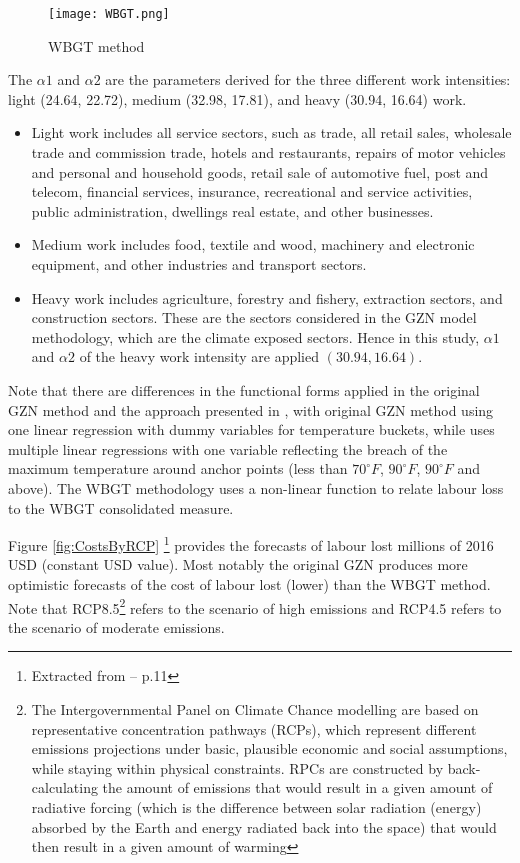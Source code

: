 \documentclass{article}
\begin{document}
\begin{figure}[H]
    \centering
    \texttt{[image: WBGT.png]}
    \caption{WBGT method}
    \label{fig:WBGT}
\end{figure}

The $\alpha1$ and $\alpha2$ are the parameters derived for the three different work intensities: light (24.64, 22.72), medium (32.98, 17.81), and heavy (30.94, 16.64) work.
\begin{itemize}
    \item Light work includes all service sectors, such as trade, all retail sales, wholesale trade and commission trade, hotels and restaurants, repairs of motor vehicles and personal and household goods, retail sale of automotive fuel, post and telecom, financial services, insurance, recreational and service activities, public administration, dwellings real estate, and other businesses.
    \item Medium work includes food, textile and wood, machinery and electronic equipment, and other industries and transport sectors.
    \item Heavy work includes agriculture, forestry and fishery, extraction sectors, and construction sectors. These are the sectors considered in the GZN model methodology, which are the climate exposed sectors. Hence in this study, $\alpha1$ and $\alpha2$ of the heavy work intensity are applied $(30.94, 16.64)$.
\end{itemize}



Note that there are differences in the functional forms applied in the original GZN method \cite{TemperatureAndTheAllocationofTime:2014} and the approach presented in \cite{TemperatureAndWork:2021}, with original GZN method using one linear regression with dummy variables for temperature buckets, while \cite{TemperatureAndWork:2021} uses multiple linear regressions with one variable reflecting the breach of the maximum temperature around anchor points (less than $70^\circ F$, $90^\circ F$, $90^\circ F$ and above). The WBGT methodology uses a non-linear function to relate labour loss to the WBGT consolidated measure.   

Figure \ref{fig:CostsByRCP} \footnote{Extracted from \cite{ZhangAndShindell:2021} -- p.11} provides the forecasts of labour lost millions of 2016 USD (constant USD value). Most notably the original GZN produces more optimistic forecasts of the cost of labour lost (lower) than the WBGT method. Note that RCP8.5\footnote{The Intergovernmental Panel on Climate Chance modelling are based on representative concentration pathways (RCPs), which represent different emissions projections under basic, plausible economic and social assumptions, while staying within physical constraints. RPCs are constructed by back-calculating the amount of emissions that would result in a given amount of radiative forcing (which is the difference between solar radiation (energy) absorbed by the Earth and energy radiated back into the space) that would then result in a given amount of warming} refers to the scenario of high emissions and RCP4.5 refers to the scenario of moderate emissions.
\end{document}
